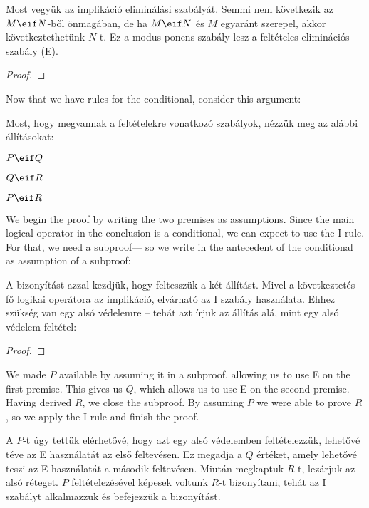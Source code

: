 Most vegyük az implikáció eliminálási szabályát. Semmi nem következik az $M\eif N$-ből önmagában, de ha $M \eif N$ és $M$ egyaránt szerepel, akkor következtethetünk $N$-t. Ez a modus ponens szabály lesz a feltételes eliminációs szabály ({\eif}E).

\begin{proof}
	 
\end{proof}

Now that we have rules for the conditional, consider this argument:

Most, hogy megvannak a feltételekre vonatkozó szabályok, nézzük meg az alábbi állításokat:

\label{proofHS}
\begin{earg}
\item[] $P \eif Q$
\item[] $Q \eif R$
\item[\therefore] $P \eif R$
\end{earg}
We begin the proof by writing the two premises as assumptions. Since the main logical operator in the conclusion is a conditional, we can expect to use the {\eif}I rule. For that, we need a subproof--- so we write in the antecedent of the conditional as assumption of a subproof:

A bizonyítást azzal kezdjük, hogy feltesszük a két állítást. Mivel a következtetés fő logikai operátora az implikáció, elvárható az {\eif}I szabály használata. Ehhez szükség van egy alsó védelemre -- tehát azt írjuk az állítás alá, mint egy alsó védelem feltétel:

\begin{proof}
	\open
	\close
\end{proof}

We made $P$ available by assuming it in a subproof, allowing us to use {\eif}E on the first premise. This gives us $Q$, which allows us to use {\eif}E on the second premise. Having derived  $R$, we close the subproof. By assuming $P$ we were able to prove $R$, so we apply the {\eif}I rule and finish the proof.

A $P$-t úgy tettük elérhetővé, hogy azt egy alsó védelemben feltételezzük, lehetővé téve az {\eif}E használatát az első feltevésen. Ez megadja a $Q$ értéket, amely lehetővé teszi az {\eif}E használatát a második feltevésen. Miután megkaptuk $R$-t, lezárjuk az alsó réteget. $P$ feltételezésével képesek voltunk $R$-t bizonyítani, tehát az {\eif}I szabályt alkalmazzuk és befejezzük a bizonyítást.

